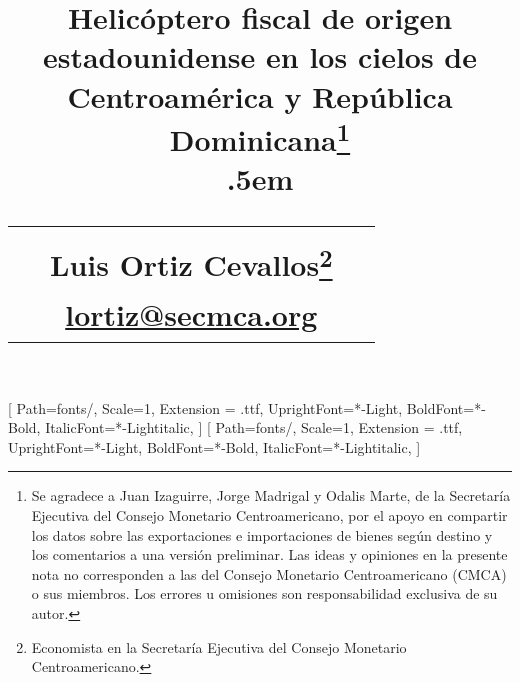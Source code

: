 \setsansfont{Futura}[
   Path=fonts/,
   Scale=1,
   Extension = .ttf,
   UprightFont=*-Light,
   BoldFont=*-Bold,
   ItalicFont=*-Lightitalic,
    ]
\setmainfont{Futura}[
    Path=fonts/,
    Scale=1,
    Extension = .ttf,
    UprightFont=*-Light,
    BoldFont=*-Bold,
    ItalicFont=*-Lightitalic,
    ]

\usepackage[%
bibstyle=authoryear,%
citestyle=authoryear-icomp,%
sorting=nyt,%
backend=bibtex,%
url=false,%
uniquename=false,%
doi=false,%
bibencoding=utf8%
]{biblatex}


%
\makeatletter
\def\@maketitle{%
	\newpage
	\null
	\vskip 0.5em%
	\begin{center}%
		\let \footnote \thanks
		{\large \@title \par}%
		\vskip 0.7em%
	\end{center}%
	\par
	\vskip 1.5em}
\makeatother


\usepackage{float}
\usepackage{lscape}

\title{\Large{Helicóptero fiscal de origen estadounidense en los cielos de Centroamérica y República Dominicana\thanks{Se agradece a Juan Izaguirre, Jorge Madrigal y Odalis Marte, de la Secretaría Ejecutiva del Consejo Monetario Centroamericano, por el apoyo en compartir los datos sobre las exportaciones e importaciones de bienes según destino y los comentarios a una versión preliminar. Las ideas y opiniones en la presente nota no corresponden a las del Consejo Monetario Centroamericano (CMCA) o sus miembros. Los errores u omisiones son responsabilidad exclusiva de su autor.}
}
\\
\lineskip .5em
\begin{tabular}{ccc}
& & \\
\hspace{0.01em}%
     & \normalsize{Luis Ortiz Cevallos\footnote{Economista en la Secretaría Ejecutiva del Consejo Monetario Centroamericano.}} & \\
    \hspace{0.01em}%
    &
		\normalsize{\href{mailto:lortiz@secmca.org}{lortiz@secmca.org}} & \\
\end{tabular}
}  %


